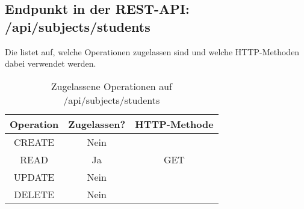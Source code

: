\subsection{Endpunkt in der REST-API: /api/subjects/students}
Die  listet auf, welche Operationen zugelassen sind und welche HTTP-Methoden dabei verwendet werden. 

\begin{table}[!htbp]
	\begin{tabular}{|c|c|c|}
		\hline
			\textbf{Operation} & \textbf{Zugelassen?} & \textbf{HTTP-Methode} \\ \hline
			CREATE & Nein & \\ \hline 
			READ & Ja & GET \\ \hline
			UPDATE & Nein & \\ \hline 
			DELETE & Nein & \\ \hline
	\end{tabular}

		\caption{Zugelassene Operationen auf /api/subjects/students}
		\label{tab:end:rest:api:subjects:students:meth}
\end{table}

